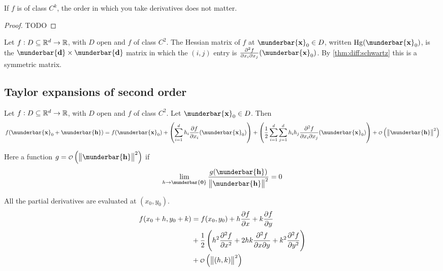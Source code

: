 \documentclass[14pt]{extarticle}
\renewcommand{\vec}[1]{\munderbar{\mathbf{#1}}}
\newcommand{\Hg}{{\operatorfont Hg}}
\begin{document}
\begin{theorem}[schwartz]
    \label{thm:diff:schwartz}
    If $f$ is of class $C^k$, the order in which you take derivatives does not matter.
\end{theorem}


\begin{proof}
    TODO
\end{proof}

\begin{definition}
    Let $f: D \subseteq \mathbb{R}^d \to \mathbb{R}$, with $D$ open and $f$ of class $C^2$.
    The Hessian matrix of $f$ at $\vec{x}_0 \in D$, written $\Hg(\vec{x}_0)$, is the $\vec{d} \times \vec{d}$ matrix in which the $(i, j)$ entry is $\pdv[2]{f}{x_i}{x_j}()(\vec{x}_0)$.
    By \autoref{thm:diff:schwartz} this is a symmetric matrix.
\end{definition}

\subsection{Taylor expansions of second order}

\begin{theorem}
    Let $f: D \subseteq \mathbb{R}^d \to \mathbb{R}$, with $D$ open and $f$ of class $C^2$. Let $\vec x_0 \in D$.
    Then
    \begin{equation}
        f(\vec x_0 + \vec h) = f(\vec x_0) + \left( \sum^d_{i = 1} h_i \pdv{f}{x_i}()(\vec x_0) \right) + \left(\frac{1}{2} \sum^d_{i = 1} \sum^d_{j = 1} h_i h_j \pdv[2]{f}{x_i}{x_j}()(\vec x_0) \right) + \o\left(\norm{\vec h}^2\right)
    \end{equation}

    Here a function $g = \o\left(\norm{\vec h}^2\right)$ if
    \begin{equation}
        \lim_{h \to \vec 0} \frac{g(\vec h)}{\norm{\vec h}^2} = 0
    \end{equation}
\end{theorem}

\begin{example}[$d = 2$]
    All the partial derivatives are evaluated at $(x_0, y_0)$.
    \begin{align}
        f(x_0 + h, y_0 + k) & = f(x_0, y_0) + h \pdv{f}{x} + k \pdv{f}{y}                                                                              \\
                            & + \frac{1}{2} \left( h^2 \pdv[2]{f}{x} + 2hk \pdv[2]{f}{x}{y} + k^2 \pdv[2]{f}{y} \right) \label{eq:taylor:second_order} \\
                            & + \o \left( \norm{(h, k)}^2 \right)
    \end{align}
\end{example}
\end{document}
